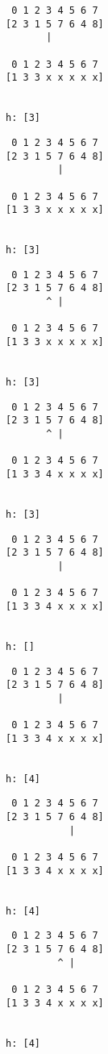 { \begin{verbatim}
 0 1 2 3 4 5 6 7
[2 3 1 5 7 6 4 8]
       |

 0 1 2 3 4 5 6 7
[1 3 3 x x x x x]


h: [3]
\end{verbatim} }

{ \begin{verbatim}
 0 1 2 3 4 5 6 7
[2 3 1 5 7 6 4 8]
         |

 0 1 2 3 4 5 6 7
[1 3 3 x x x x x]


h: [3]
\end{verbatim} }

{ \begin{verbatim}
 0 1 2 3 4 5 6 7
[2 3 1 5 7 6 4 8]
       ^ |

 0 1 2 3 4 5 6 7
[1 3 3 x x x x x]


h: [3]
\end{verbatim} }

{ \begin{verbatim}
 0 1 2 3 4 5 6 7
[2 3 1 5 7 6 4 8]
       ^ |

 0 1 2 3 4 5 6 7
[1 3 3 4 x x x x]


h: [3]
\end{verbatim} }

{ \begin{verbatim}
 0 1 2 3 4 5 6 7
[2 3 1 5 7 6 4 8]
         |

 0 1 2 3 4 5 6 7
[1 3 3 4 x x x x]


h: []
\end{verbatim} }

{ \begin{verbatim}
 0 1 2 3 4 5 6 7
[2 3 1 5 7 6 4 8]
         |

 0 1 2 3 4 5 6 7
[1 3 3 4 x x x x]


h: [4]
\end{verbatim} }

{ \begin{verbatim}
 0 1 2 3 4 5 6 7
[2 3 1 5 7 6 4 8]
           |

 0 1 2 3 4 5 6 7
[1 3 3 4 x x x x]


h: [4]
\end{verbatim} }

{ \begin{verbatim}
 0 1 2 3 4 5 6 7
[2 3 1 5 7 6 4 8]
         ^ |

 0 1 2 3 4 5 6 7
[1 3 3 4 x x x x]


h: [4]
\end{verbatim} }

